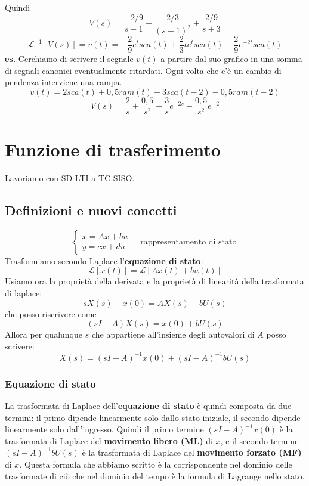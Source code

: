 Quindi
\[
    V(s) = \frac{-2/9}{s-1} + \frac{2/3}{(s-1)^2} + \frac{2/9}{s+3}
\]
\[
    \mathcal{L}^{-1}[V(s)] = v(t) = -\frac{2}{9} e^{t} sca(t) + \frac{2}{3} t e^{t} sca(t) + \frac{2}{9}e^{-2t} sca(t)
\]
\newline
\newline
\textbf{es.}\newline 
Cerchiamo di scrivere il segnale $v(t)$ a partire dal suo grafico in una somma di segnali canonici eventualmente ritardati.\newline
Ogni volta che c'è un cambio di pendenza interviene una rampa.\newline
\[
    v(t)= 2 sca(t) + 0,5 ram(t) - 3 sca(t-2) - 0,5 ram(t-2)
\] 
\[
    V(s) = \frac{2}{s} + \frac{0,5}{s^2} - \frac{3}{s}e^{-2s} - \frac{0,5}{s^2}e^{-2} 
\]
\newpage
\section{Funzione di trasferimento}
Lavoriamo con SD LTI a TC SISO.
\subsection{Definizioni e nuovi concetti}
\[
    \begin{cases}
        \dot{x} = Ax + bu\\
        y = cx + du
    \end{cases} \;\;\;\; \text{rappresentamento di stato}\;
\]
\newline
Trasformiamo secondo Laplace l'\textbf{equazione di stato}:
\[
    \mathcal{L}[\dot{x}(t)] = \mathcal{L}[Ax(t) + bu(t)]
\]
Usiamo ora la proprietà della derivata e la proprietà di linearità della trasformata di laplace:
\[
    sX(s)-x(0) = AX(s) + bU(s)
\]
che posso riscrivere come
\[
    (sI-A)X(s) = x(0) + bU(s)
\]
Allora per qualunque $s$ che appartiene all'insieme degli autovalori di $A$ posso scrivere:
\[
    X(s) = (sI-A)^{-1} x(0) + (sI-A)^{-1} bU(s)
\]
\subsubsection{Equazione di stato}
La trasformata di Laplace dell'\textbf{equazione di stato} è quindi composta da due termini: il primo dipende linearmente solo dallo stato iniziale, il secondo dipende linearmente solo dall'ingresso. Quindi il primo termine $(sI-A)^{-1} x(0)$ è la trasformata di Laplace del \textbf{movimento libero (ML)} di $x$, e il secondo termine $(sI-A)^{-1} bU(s)$ è la trasformata di Laplace del \textbf{movimento forzato (MF)} di $x$.\newline
Questa formula che abbiamo scritto è la corrispondente nel dominio delle trasformate di ciò che nel dominio del tempo è la formula di Lagrange nello stato.
